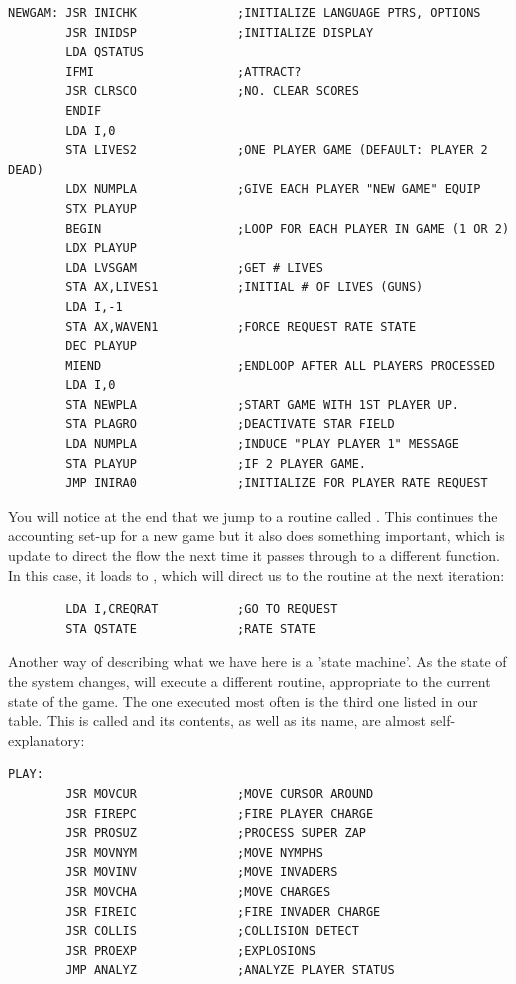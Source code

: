 \begin{lstlisting}
NEWGAM: JSR INICHK              ;INITIALIZE LANGUAGE PTRS, OPTIONS
        JSR INIDSP              ;INITIALIZE DISPLAY
        LDA QSTATUS
        IFMI                    ;ATTRACT?
        JSR CLRSCO              ;NO. CLEAR SCORES
        ENDIF
        LDA I,0
        STA LIVES2              ;ONE PLAYER GAME (DEFAULT: PLAYER 2 DEAD)
        LDX NUMPLA              ;GIVE EACH PLAYER "NEW GAME" EQUIP
        STX PLAYUP
        BEGIN                   ;LOOP FOR EACH PLAYER IN GAME (1 OR 2)
        LDX PLAYUP
        LDA LVSGAM              ;GET # LIVES
        STA AX,LIVES1           ;INITIAL # OF LIVES (GUNS)
        LDA I,-1
        STA AX,WAVEN1           ;FORCE REQUEST RATE STATE
        DEC PLAYUP
        MIEND                   ;ENDLOOP AFTER ALL PLAYERS PROCESSED
        LDA I,0
        STA NEWPLA              ;START GAME WITH 1ST PLAYER UP.
        STA PLAGRO              ;DEACTIVATE STAR FIELD
        LDA NUMPLA              ;INDUCE "PLAY PLAYER 1" MESSAGE
        STA PLAYUP              ;IF 2 PLAYER GAME.
        JMP INIRA0              ;INITIALIZE FOR PLAYER RATE REQUEST
\end{lstlisting}

You will notice at the end that we jump to a routine called . This continues the accounting set-up for a new
game but it also does something important, which is update  to direct the flow the next time it passes through
 to a different function. In this case, it loads  to , which will direct us to the routine
 at the next iteration:
\begin{lstlisting}
        LDA I,CREQRAT           ;GO TO REQUEST
        STA QSTATE              ;RATE STATE
\end{lstlisting}

Another way of describing what we have here is a 'state machine'. As the state of the system changes,  will execute
a different routine, appropriate to the current state of the game. The one executed most often is the third one listed in our
 table. This is called  and its contents, as well as its name, are almost self-explanatory:

\begin{lstlisting}
PLAY:
        JSR MOVCUR              ;MOVE CURSOR AROUND
        JSR FIREPC              ;FIRE PLAYER CHARGE
        JSR PROSUZ              ;PROCESS SUPER ZAP
        JSR MOVNYM              ;MOVE NYMPHS
        JSR MOVINV              ;MOVE INVADERS
        JSR MOVCHA              ;MOVE CHARGES
        JSR FIREIC              ;FIRE INVADER CHARGE
        JSR COLLIS              ;COLLISION DETECT
        JSR PROEXP              ;EXPLOSIONS
        JMP ANALYZ              ;ANALYZE PLAYER STATUS
\end{lstlisting}

